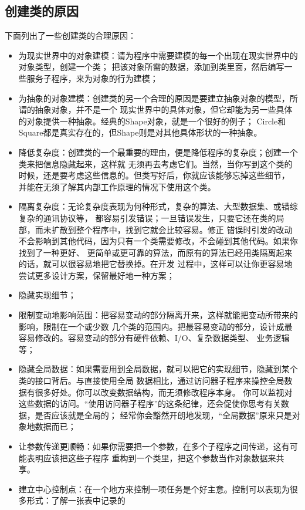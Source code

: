 \documentclass{article}
\begin{document}
\subsection{创建类的原因}
下面列出了一些创建类的合理原因：
\begin{itemize}
    \item 为现实世界中的对象建模：请为程序中需要建模的每一个出现在现实世界中的对象类型，创建一个类；
    把该对象所需的数据，添加到类里面，然后编写一些服务子程序，来为对象的行为建模；
    \item 为抽象的对象建模：创建类的另一个合理的原因是要建立抽象对象的模型，所谓的抽象对象，并不是一个
    现实世界中的具体对象，但它却能为另一些具体的对象提供一种抽象。经典的Shape对象，就是一个很好的例子；
    Circle和Square都是真实存在的，但Shape则是对其他具体形状的一种抽象。
    \item 降低复杂度：创建类的一个最重要的理由，便是降低程序的复杂度；创建一个类来把信息隐藏起来，这样就
    无须再去考虑它们。当然，当你写到这个类的时候，还是要考虑这些信息的。但类写好后，你就应该能够忘掉这些细节，
    并能在无须了解其内部工作原理的情况下使用这个类。
    \item 隔离复杂度：无论复杂度表现为何种形式，复杂的算法、大型数据集、或错综复杂的通讯协议等，
    都容易引发错误；一旦错误发生，只要它还在类的局部，而未扩散到整个程序中，找到它就会比较容易。修正
    错误时引发的改动不会影响到其他代码，因为只有一个类需要修改，不会碰到其他代码。如果你找到了一种更好、
    更简单或更可靠的算法，而原有的算法已经用类隔离起来的话，就可以很容易地把它替换掉。在开发
    过程中，这样可以让你更容易地尝试更多设计方案，保留最好地一种方案；
    \item 隐藏实现细节；
    \item 限制变动地影响范围：把容易变动的部分隔离开来，这样就能把变动所带来的影响，限制在一个或少数
    几个类的范围内。把最容易变动的部分，设计成最容易修改的。容易变动的部分有硬件依赖、I/O、复杂数据类型、
    业务逻辑等；
    \item 隐藏全局数据：如果需要用到全局数据，就可以把它的实现细节，隐藏到某个类的接口背后。与直接使用全局
    数据相比，通过访问器子程序来操控全局数据有很多好处。你可以改变数据结构，而无须修改程序本身。
    你可以监视对这些数据的访问。“使用访问器子程序”的这条纪律，还会促使你思考有关数据，是否应该就是全局的；
    经常你会豁然开朗地发现，“全局数据”原来只是对象地数据而已；
    \item 让参数传递更顺畅：如果你需要把一个参数，在多个子程序之间传递，这有可能表明应该把这些子程序
    重构到一个类里，把这个参数当作对象数据来共享。
    \item 建立中心控制点：在一个地方来控制一项任务是个好主意。控制可以表现为很多形式：了解一张表中记录的

\end{itemize}
\end{document}
